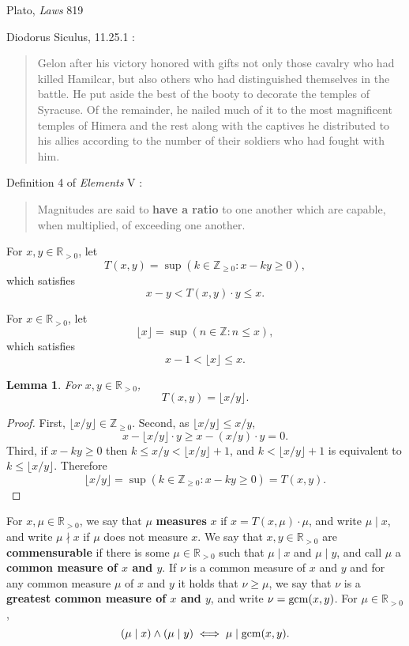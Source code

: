 \documentclass{article}
\newcommand{\gcm}{\ensuremath\mathrm{gcm}}
\newtheorem{lemma}[theorem]{Lemma}
\begin{document}
Plato, {\em Laws} 819

Diodorus Siculus, 11.25.1 \cite[pp.~124--125]{sage}:

\begin{quote}
Gelon after his victory honored with gifts not only those cavalry who had killed Hamilcar, but
also others who had distinguished themselves in the battle. He put aside the best of the booty
to decorate the temples of Syracuse. Of the remainder, he nailed much of it to the most
magnificent temples of Himera and the rest along with the captives he distributed to his allies
according to the number of their soldiers who had fought with him. 
\end{quote}

Definition 4 of {\em Elements} V \cite[p.~114]{euclidII}:

\begin{quote}
Magnitudes are said to \textbf{have a ratio} to one another
which are capable, when multiplied, of exceeding one another.
\end{quote}


For $x,y \in \mathbb{R}_{> 0}$, let
\[
T(x,y) = \sup(k \in \mathbb{Z}_{\geq 0} : x-ky \geq 0),
\]
which satisfies
\begin{equation}
x-y < T(x,y) \cdot y \leq x.
\label{Txy}
\end{equation}

For $x \in \mathbb{R}_{>0}$, let
\[
\lfloor x \rfloor = \sup(n \in \mathbb{Z} : n \leq x),
\]
which satisfies
\[
x-1 < \lfloor x \rfloor \leq x.
\]

\begin{lemma}
For $x,y \in \mathbb{R}_{>0}$,
\[
T(x,y) = \lfloor x/y \rfloor.
\]
\end{lemma}
\begin{proof}
First, $\lfloor x/y \rfloor \in \mathbb{Z}_{\geq 0}$.
Second,
as $\lfloor x/y \rfloor \leq x/y$,
\[
x-\lfloor x/y \rfloor \cdot y \geq x - (x/y) \cdot y = 0.
\]
Third, if $x-ky \geq 0$ then $k \leq x/y < \lfloor x/y \rfloor + 1$, and $k < \lfloor x/y \rfloor + 1$ is equivalent to
$k \leq \lfloor x/y \rfloor$. Therefore
\[
\lfloor x/y \rfloor = \sup(k \in \mathbb{Z}_{\geq 0} : x-ky \geq 0) = T(x,y).
\]
\end{proof}


For $x,\mu \in \mathbb{R}_{>0}$, we say that $\mu$ \textbf{measures} $x$ if
$x = T(x,\mu) \cdot \mu$,
and write $\mu \mid x$, and write $\mu \nmid x$ if $\mu$ does not measure $x$. We say that $x,y \in \mathbb{R}_{>0}$ are \textbf{commensurable} 
if there is some $\mu \in \mathbb{R}_{>0}$ such that $\mu \mid x$  and $\mu \mid y$, and call $\mu$ a \textbf{common measure of $x$ and $y$}.
If $\nu$ is a common measure of $x$ and $y$ and for any common measure $\mu$ of $x$ and $y$ it holds that $\nu \geq \mu$, 
we say that $\nu$ is a \textbf{greatest common measure of $x$ and $y$}, and write
$\nu=\gcm(x,y)$.
For $\mu \in \mathbb{R}_{> 0}$,
\[
(\mu \mid x) \wedge (\mu \mid y) \iff \mu \mid \gcm(x,y).
\]
\end{document}
